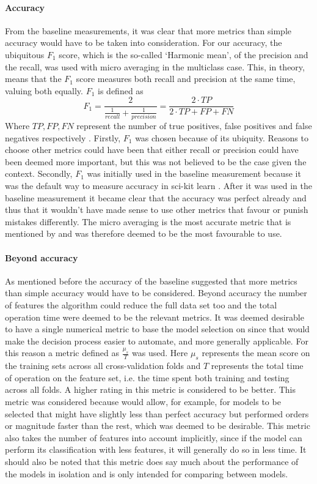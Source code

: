 \documentclass[british]{article}
\begin{document}
	\paragraph{Accuracy}From the baseline measurements, it was clear that more metrics than simple accuracy would have to be taken into consideration. For our accuracy, the ubiquitous $F_1$ score, which is the so-called `Harmonic mean', of the precision and the recall, was used with micro averaging in the multiclass case. This, in theory, means that the $F_1$ score measures both recall and precision at the same time, valuing both equally. $F_1$ is defined as $$F_1 = \frac{2}{\frac{1}{recall} + \frac{1}{precision}} = \frac{2\cdot TP}{2\cdot TP + FP + FN}$$ Where $TP, FP, FN$ represent the number of true positives, false positives and false negatives respectively \autocite{Lipton2014}. Firstly, $F_1$ was chosen because of its ubiquity. Reasons to choose other metrics could have been that either recall or precision could have been deemed more important, but this was not believed to be the case given the context. Secondly, $F_1$ was initially used in the baseline measurement because it was the default way to measure accuracy in sci-kit learn \autocite{Pedregosa2012}. After it was used in the baseline measurement it became clear that the accuracy was perfect already and thus that it wouldn't have made sense to use other metrics that favour or punish mistakes differently. The micro averaging is the most accurate metric that is mentioned by \citeauthor{Lipton2014} and was therefore deemed to be the most favourable to use. 
	
	\paragraph{Beyond accuracy} As mentioned before the accuracy of the baseline suggested that more metrics than simple accuracy would have to be considered. Beyond accuracy the number of features the algorithm could reduce the full data set too and the total operation time were deemed to be the relevant metrics. It was deemed desirable to have a single numerical metric to base the model selection on since that would make the decision process easier to automate, and more generally applicable. For this reason a metric defined as $\frac{\mu_s}{T}$ was used. Here $\mu_s$ represents the mean score on the training sets across all cross-validation folds and $T$ represents the total time of operation on the feature set, i.e. the time spent both training and testing across all folds. A higher rating in this metric is considered to be better. This metric was considered because would allow, for example, for models to be selected that might have slightly less than perfect accuracy but performed orders or magnitude faster than the rest, which was deemed to be desirable. This metric also takes the number of features into account implicitly, since if the model can perform its classification with less features, it will generally do so in less time. It should also be noted that this metric does say much about the performance of the models in isolation and is only intended for comparing between models.
	
\end{document}
